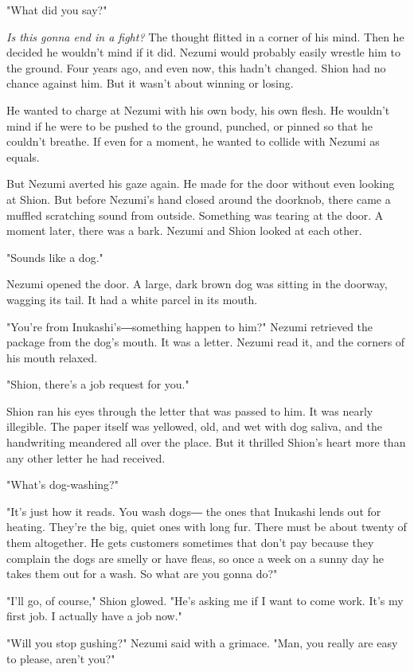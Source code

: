 "What did you say?"

\emph{Is this gonna end in a fight?} The thought flitted in a corner of his
mind. Then he decided he wouldn't mind if it did. Nezumi would probably
easily wrestle him to the ground. Four years ago, and even now, this
hadn't changed. Shion had no chance against him. But it wasn't about
winning or losing.

He wanted to charge at Nezumi with his own body, his own flesh. He
wouldn't mind if he were to be pushed to the ground, punched, or pinned
so that he couldn't breathe. If even for a moment, he wanted to collide
with Nezumi as equals.

But Nezumi averted his gaze again. He made for the door without even
looking at Shion. But before Nezumi's hand closed around the doorknob,
there came a muffled scratching sound from outside. Something was
tearing at the door. A moment later, there was a bark. Nezumi and Shion
looked at each other.

"Sounds like a dog."

Nezumi opened the door. A large, dark brown dog was sitting in the
doorway, wagging its tail. It had a white parcel in its mouth.

"You're from Inukashi's―something happen to him?" Nezumi retrieved the
package from the dog's mouth. It was a letter. Nezumi read it, and the
corners of his mouth relaxed.

"Shion, there's a job request for you."

Shion ran his eyes through the letter that was passed to him. It was
nearly illegible. The paper itself was yellowed, old, and wet with dog
saliva, and the handwriting meandered all over the place. But it
thrilled Shion's heart more than any other letter he had received.


"What's dog-washing?"

"It's just how it reads. You wash dogs― the ones that Inukashi lends out
for heating. They're the big, quiet ones with long fur. There must be
about twenty of them altogether. He gets customers sometimes that don't
pay because they complain the dogs are smelly or have fleas, so once a
week on a sunny day he takes them out for a wash. So what are you gonna
do?"

"I'll go, of course," Shion glowed. "He's asking me if I want to come
work. It's my first job. I actually have a job now."

"Will you stop gushing?" Nezumi said with a grimace. "Man, you really
are easy to please, aren't you?"

